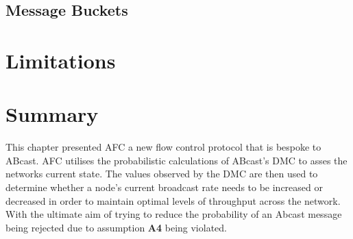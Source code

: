     \subsection*{Message Buckets}
    
\section{Limitations}

\section{Summary}
This chapter presented AFC a new flow control protocol that is bespoke to \textsf{ABcast}.  AFC utilises the probabilistic calculations of \textsf{ABcast}'s DMC to asses the networks current state.  The values observed by the DMC are then used to determine whether a node's current broadcast rate needs to be increased or decreased in order to maintain optimal levels of throughput across the network.  With the ultimate aim of trying to reduce the probability of an \textsf{Abcast} message being rejected due to assumption \textbf{A4} being violated.    